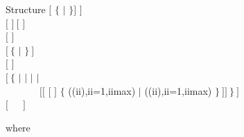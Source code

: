 \begin{DataStructure}{Structure }
  $[$  $\{$  $|$  $\}$$]$ $]$ \\
$[$  $]~[$  $]$ \\
$[$   $]$ \\
$[~\{$  $|$  $\}~]$ \\
$[$   $]$ \\
$[~\{$  $|$  $|$  $|$  $|$\\
~~~~~~~$[[$  $[$ \moc{*} $]$  $\{$  ((ii),ii=1,iimax)  $|$  ((ii),ii=1,iimax)  $\}~]]~\}~]$ \\
$[$~~~$]$
\end{DataStructure}

\noindent where

